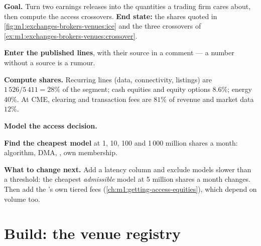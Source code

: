 \begin{tutorial}
\textbf{Goal.} Turn two earnings releases into the quantities a trading firm
cares about, then compute the access crossovers. \textbf{End state:} the
shares quoted in \cref{fig:m1:exchanges-brokers-venues:ice} and the three
crossovers of \cref{ex:m1:exchanges-brokers-venues:crossover}.
\begin{tutsteps}
\item \textbf{Enter the published lines}, with their source in a comment ---
a number without a source is a rumour.
\label{lst:m1:exchanges-brokers-venues:data}
\item \textbf{Compute shares.} Recurring lines (data, connectivity,
listings) are $1\,526/5\,411 = 28\%$ of the segment; cash equities and
equity options $8.6\%$; energy $40\%$. At CME, clearing and transaction fees
are $81\%$ of revenue and market data $12\%$.
\item \textbf{Model the access decision.}
\label{lst:m1:exchanges-brokers-venues:access}
\item \textbf{Find the cheapest model} at 1, 10, 100 and 1\,000 million
shares a month:  algorithm, DMA, , own membership.
\end{tutsteps}
\textbf{What to change next.} Add a latency column and exclude models slower
than a threshold: the cheapest \emph{admissible} model at 5 million shares a
month changes. Then add the 's own tiered fees
(\cref{ch:m1:getting-access-equities}), which depend on volume too.
\end{tutorial}

\section{Build: the venue registry}\label{bld:m1:exchanges-brokers-venues:registry}

